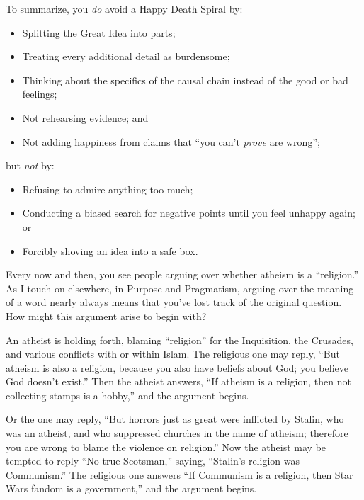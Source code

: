 {
 To summarize, you \textit{do} avoid a Happy Death Spiral by:}

\begin{itemize}
\item Splitting the Great Idea into parts;
\item Treating every additional detail as burdensome;
\item  Thinking about the specifics of the causal chain instead of the
good or bad feelings;
\item  Not rehearsing evidence; and
\item Not adding happiness from claims that ``you
can't \textit{prove} are wrong'';
\end{itemize}

{
 but \textit{not} by:}

\begin{itemize}
\item Refusing to admire anything too much;
\item  Conducting a biased search for negative points until you feel
unhappy again; or
\item  Forcibly shoving an idea into a safe box.
\end{itemize}

\myendsectiontext


{
 Every now and then, you see people arguing over whether atheism is
a ``religion.'' As I touch on
elsewhere, in Purpose and Pragmatism, arguing over the meaning of a
word nearly always means that you've lost track of the
original question. How might this argument arise to begin with? }

{
 An atheist is holding forth, blaming
``religion'' for the Inquisition,
the Crusades, and various conflicts with or within Islam. The religious
one may reply, ``But atheism is also a religion,
because you also have beliefs about God; you believe God
doesn't exist.'' Then the atheist
answers, ``If atheism is a religion, then not
collecting stamps is a hobby,'' and the argument
begins.}

{
 Or the one may reply, ``But horrors just as great
were inflicted by Stalin, who was an atheist, and who suppressed
churches in the name of atheism; therefore you are wrong to blame the
violence on religion.'' Now the atheist may be
tempted to reply ``No true
Scotsman,'' saying,
``Stalin's religion was
Communism.'' The religious one answers
``If Communism is a religion, then Star Wars fandom is
a government,'' and the argument begins.}

